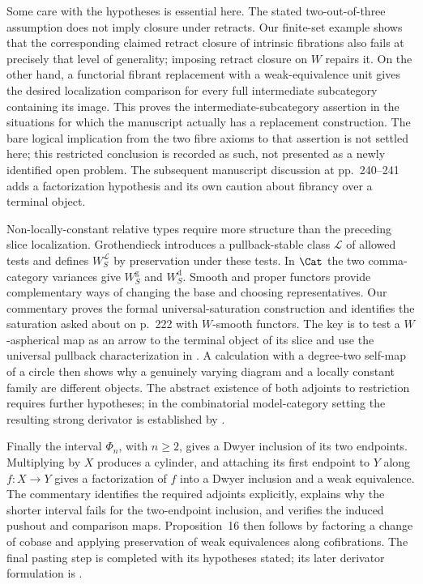 Some care with the hypotheses is essential here. The stated two-out-of-three assumption does not imply closure under retracts. Our finite-set example shows that the corresponding claimed retract closure of intrinsic fibrations also fails at precisely that level of generality; imposing retract closure on $W$ repairs it. On the other hand, a functorial fibrant replacement with a weak-equivalence unit gives the desired localization comparison for every full intermediate subcategory containing its image. This proves the intermediate-subcategory assertion in the situations for which the manuscript actually has a replacement construction. The bare logical implication from the two fibre axioms to that assertion is not settled here; this restricted conclusion is recorded as such, not presented as a newly identified open problem. The subsequent manuscript discussion at pp.~240--241 adds a factorization hypothesis and its own caution about fibrancy over a terminal object.

Non-locally-constant relative types require more structure than the preceding slice localization. Grothendieck introduces a pullback-stable class $\mathcal L$ of allowed tests and defines $W_S^{\mathcal L}$ by preservation under these tests. In $\Cat$ the two comma-category variances give $W_S^{\mathrm g}$ and $W_S^{\mathrm d}$. Smooth and proper functors provide complementary ways of changing the base and choosing representatives. Our commentary proves the formal universal-saturation construction and identifies the saturation asked about on p.~222 with $W$-smooth functors. The key is to test a $W$-aspherical map as an arrow to the terminal object of its slice and use the universal pullback characterization in \citet[Theorem~1.2(c)]{Maltsiniotis2005Asphericite}. A calculation with a degree-two self-map of a circle then shows why a genuinely varying diagram and a locally constant family are different objects. The abstract existence of both adjoints to restriction requires further hypotheses; in the combinatorial model-category setting the resulting strong derivator is established by \citet[Proposition~1.30]{Groth2013}.

Finally the interval $\Phi_n$, with $n\geq2$, gives a Dwyer inclusion of its two endpoints. Multiplying by $X$ produces a cylinder, and attaching its first endpoint to $Y$ along $f:X\to Y$ gives a factorization of $f$ into a Dwyer inclusion and a weak equivalence. The commentary identifies the required adjoints explicitly, explains why the shorter interval fails for the two-endpoint inclusion, and verifies the induced pushout and comparison maps. Proposition~16 then follows by factoring a change of cobase and applying preservation of weak equivalences along cofibrations. The final pasting step is completed with its hypotheses stated; its later derivator formulation is \citet[Proposition~3.13]{Groth2013}.

